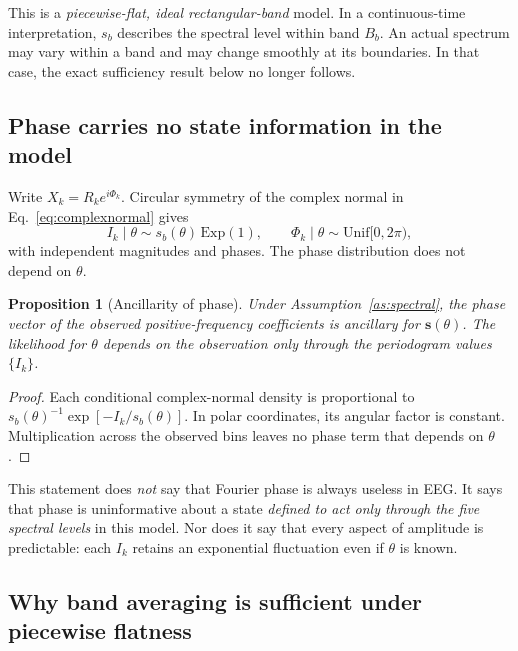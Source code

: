 \documentclass[11pt,a4paper]{article}
\newtheorem{proposition}{Proposition}
\begin{document}
This is a \emph{piecewise-flat, ideal rectangular-band} model. In a continuous-time
interpretation, $s_b$ describes the spectral level within band $B_b$. An actual
spectrum may vary within a band and may change smoothly at its boundaries. In that
case, the exact sufficiency result below no longer follows.

\subsection{Phase carries no state information in the model}

Write $X_k=R_ke^{i\Phi_k}$. Circular symmetry of the complex normal in
Eq.~\eqref{eq:complexnormal} gives
\begin{equation}
I_k\mid\theta\sim s_b(\theta)\,\mathrm{Exp}(1),\qquad
\Phi_k\mid\theta\sim\mathrm{Unif}[0,2\pi),
\label{eq:exponential}
\end{equation}
with independent magnitudes and phases. The phase distribution does not depend on
$\theta$.

\begin{proposition}[Ancillarity of phase]\label{prop:phase}
Under Assumption~\ref{as:spectral}, the phase vector of the observed positive-frequency
coefficients is ancillary for $\bm s(\theta)$. The likelihood for $\theta$ depends on
the observation only through the periodogram values $\{I_k\}$.
\end{proposition}
\begin{proof}
Each conditional complex-normal density is proportional to
$s_b(\theta)^{-1}\exp[-I_k/s_b(\theta)]$. In polar coordinates, its angular factor
is constant. Multiplication across the observed bins leaves no phase term that
depends on $\theta$.
\end{proof}

This statement does \emph{not} say that Fourier phase is always useless in EEG.
It says that phase is uninformative about a state \emph{defined to act only through
the five spectral levels} in this model. Nor does it say that every aspect of
amplitude is predictable: each $I_k$ retains an exponential fluctuation even if
$\theta$ is known.

\subsection{Why band averaging is sufficient under piecewise flatness}
\end{document}
